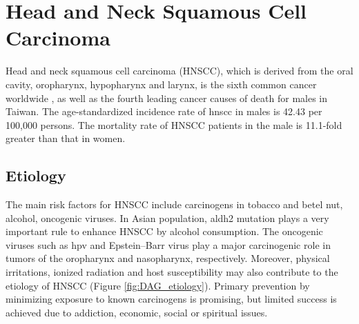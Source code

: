 \documentclass[12pt, a4paper]{article}
\begin{document}







\section{Head and Neck Squamous Cell Carcinoma}
\label{sec:section}

Head and neck squamous cell carcinoma (HNSCC), which is derived from the oral cavity, oropharynx, hypopharynx and larynx, is the sixth common cancer worldwide \citep{Siegel2016}, as well as the fourth leading cancer causes of death for males in Taiwan\citep{MOHW_death2017}. The age-standardized incidence rate of \acrshort{hnscc} in males is 42.43 per 100,000 persons\citep{MOHW_incidence2018}. The mortality rate of HNSCC patients in the male is 11.1-fold greater than that in women.




\subsection{Etiology}
The main risk factors for HNSCC include carcinogens in tobacco and betel nut, alcohol, oncogenic viruses.
In Asian population, \acrfull{aldh2} mutation plays a very important rule to enhance HNSCC\citep{Chien2019} by alcohol consumption.
The oncogenic viruses such as \acrfull{hpv} and Epstein–Barr virus play a major carcinogenic role in tumors of the oropharynx and nasopharynx, respectively\citep{Ferrarotto2017}.
Moreover, physical irritations, ionized radiation and host susceptibility may also contribute to the etiology of HNSCC\citep{Ko1995,Znaori2003} (Figure \ref{fig:DAG_etiology}).
Primary prevention by minimizing exposure to known carcinogens is promising, but limited success is achieved due to addiction, economic, social or spiritual issues.
\end{document}
